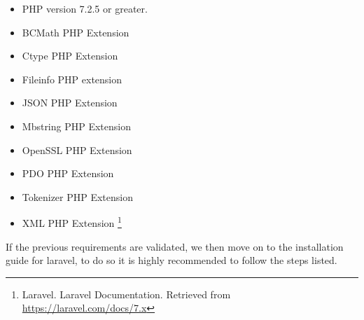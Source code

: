 \begin{itemize}
    \item PHP version 7.2.5 or greater. 
    \item BCMath PHP Extension
    \item Ctype PHP Extension
    \item Fileinfo PHP extension
    \item JSON PHP Extension
    \item Mbstring PHP Extension
    \item OpenSSL PHP Extension
    \item PDO PHP Extension
    \item Tokenizer PHP Extension
    \item XML PHP Extension \footnote{Laravel. Laravel Documentation. Retrieved from \url{https://laravel.com/docs/7.x} }
\end{itemize}
 \medskip If the previous requirements are validated, we then move on to the installation guide for laravel, to do so it is highly recommended to follow the steps listed.
